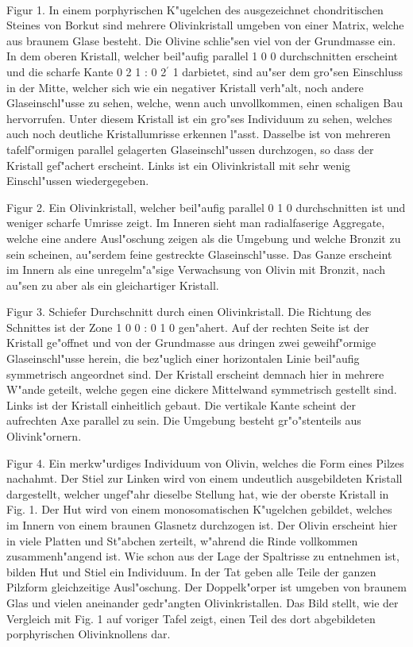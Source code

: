 \documentclass[a4paper, 11pt, oneside, polutonikogreek, german]{article}
\begin{document}
\paragraph{}
Figur 1. In einem porphyrischen K"ugelchen des ausgezeichnet chondritischen Steines von Borkut sind mehrere Olivinkristall umgeben von einer Matrix, welche aus braunem Glase besteht. Die Olivine schlie"sen viel von der Grundmasse ein. In dem oberen Kristall, welcher beil"aufig parallel 1 0 0 durchschnitten erscheint und die scharfe Kante 0 2 1 : 0 2$^{\prime}$ 1 darbietet, sind au"ser dem gro"sen Einschluss in der Mitte, welcher sich wie ein negativer Kristall verh"alt, noch andere Glaseinschl"usse zu sehen, welche, wenn auch unvollkommen, einen schaligen Bau hervorrufen. Unter diesem Kristall ist ein gro"ses Individuum zu sehen, welches auch noch deutliche Kristallumrisse erkennen l"asst. Dasselbe ist von mehreren tafelf"ormigen parallel gelagerten Glaseinschl"ussen durchzogen, so dass der Kristall gef"achert erscheint. Links ist ein Olivinkristall mit sehr wenig Einschl"ussen wiedergegeben.

Figur 2. Ein Olivinkristall, welcher beil"aufig parallel 0 1 0 durchschnitten ist und weniger scharfe Umrisse zeigt. Im Inneren sieht man radialfaserige Aggregate, welche eine andere Ausl"oschung zeigen als die Umgebung und welche Bronzit zu sein scheinen, au"serdem feine gestreckte Glaseinschl"usse. Das Ganze erscheint im Innern als eine unregelm"a"sige Verwachsung von Olivin mit Bronzit, nach au"sen zu aber als ein gleichartiger Kristall.

Figur 3. Schiefer Durchschnitt durch einen Olivinkristall. Die Richtung des Schnittes ist der Zone 1 0 0 : 0 1 0 gen"ahert. Auf der rechten Seite ist der Kristall ge"offnet und von der Grundmasse aus dringen zwei geweihf"ormige Glaseinschl"usse herein, die bez"uglich einer horizontalen Linie beil"aufig symmetrisch angeordnet sind. Der Kristall erscheint demnach hier in mehrere W"ande geteilt, welche gegen eine dickere Mittelwand symmetrisch gestellt sind. Links ist der Kristall einheitlich gebaut. Die vertikale Kante scheint der aufrechten Axe parallel zu sein. Die Umgebung besteht gr"o"stenteils aus Olivink"ornern.

Figur 4. Ein merkw"urdiges Individuum von Olivin, welches die Form eines Pilzes nachahmt. Der Stiel zur Linken wird von einem undeutlich ausgebildeten Kristall dargestellt, welcher ungef"ahr dieselbe Stellung hat, wie der oberste Kristall in Fig. 1. Der Hut wird von einem monosomatischen K"ugelchen gebildet, welches im Innern von einem braunen Glasnetz durchzogen ist. Der Olivin erscheint hier in viele Platten und St"abchen zerteilt, w"ahrend die Rinde vollkommen zusammenh"angend ist. Wie schon aus der Lage der Spaltrisse zu entnehmen ist, bilden Hut und Stiel ein Individuum. In der Tat geben alle Teile der ganzen Pilzform gleichzeitige Ausl"oschung. Der Doppelk"orper ist umgeben von braunem Glas und vielen aneinander gedr"angten Olivinkristallen. Das Bild stellt, wie der Vergleich mit Fig. 1 auf voriger Tafel zeigt, einen Teil des dort abgebildeten porphyrischen Olivinknollens dar.
\clearpage
\end{document}
